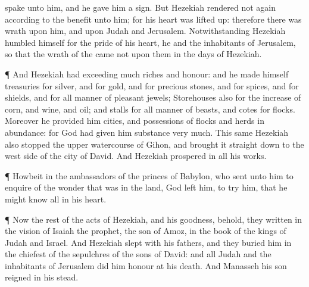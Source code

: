 {spake unto him, and he
gave him a
sign.
But
Hezekiah rendered not
again according to the
benefit
{} unto him; for his
heart was lifted
up: therefore there was
wrath upon him, and upon
Judah and
Jerusalem.
Notwithstanding
Hezekiah
humbled himself for the
pride of his
heart,
{} he and the
inhabitants of
Jerusalem, so that the
wrath of the
{}
came not upon them in the
days of
Hezekiah.
\par }{\PP {}¶ And
Hezekiah had
exceeding
much
riches and
honour: and he
made himself
treasuries for
silver, and for
gold, and for
precious
stones, and for
spices, and for
shields, and for all manner of
pleasant
jewels;
Storehouses also for the
increase of
corn, and
wine, and
oil; and
stalls for all manner of
beasts, and
cotes for
flocks.
Moreover he
provided him
cities, and
possessions of
flocks and
herds in
abundance: for
God had
given him
substance
very
much.
This same
Hezekiah also
stopped the
upper
watercourse of
Gihon, and brought it
straight
down to the west
side of the
city of
David. And
Hezekiah
prospered in all his
works.
\par }{\PP {}¶
Howbeit in
{} the
ambassadors of the
princes of
Babylon, who
sent unto him to
enquire of the
wonder that was
{} in the
land,
God
left him, to
try him, that he might
know all
{} in his
heart.
\par }{\PP {}¶ Now the
rest of the
acts of
Hezekiah, and his
goodness, behold, they
{}
written in the
vision of
Isaiah the
prophet, the
son of
Amoz,
{} in the
book of the
kings of
Judah and
Israel.
And
Hezekiah
slept with his
fathers, and they
buried him in the
chiefest of the
sepulchres of the
sons of
David: and all
Judah and the
inhabitants of
Jerusalem did
him
honour at his
death. And
Manasseh his
son
reigned in his stead.

}
